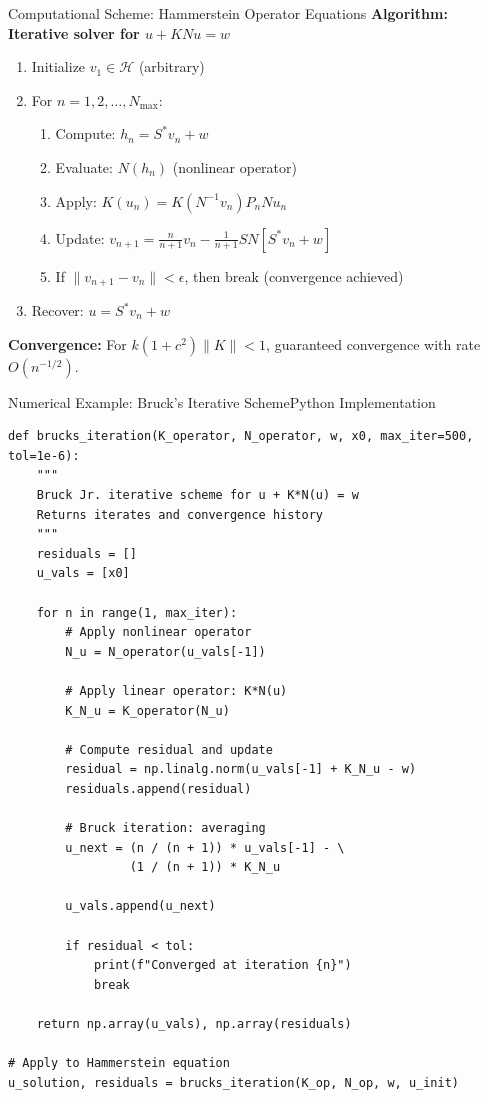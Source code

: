 \documentclass[aspectratio=169,10pt]{beamer}
\newcommand{\HH}{\mathcal{H}}
\begin{document}
\begin{frame}{Computational Scheme: Hammerstein Operator Equations}
    \textbf{Algorithm: Iterative solver for $u + KNu = w$}

    \begin{enumerate}
        \item Initialize $v_1 \in \HH$ (arbitrary)
        \item For $n = 1, 2, \ldots, N_{\max}$:
        \begin{enumerate}
            \item Compute: $h_n = S^*v_n + w$
            \item Evaluate: $N(h_n)$ (nonlinear operator)
            \item Apply: $K(u_n) = K(N^{-1}v_n)P_n Nu_n$
            \item Update: $v_{n+1} = \frac{n}{n+1}v_n - \frac{1}{n+1}SN[S^*v_n + w]$
            \item If $\|v_{n+1} - v_n\| < \epsilon$, then break (convergence achieved)
        \end{enumerate}
        \item Recover: $u = S^*v_n + w$
    \end{enumerate}

    \vspace{0.3cm}

    \textbf{Convergence:} For $k(1 + c^2)\|K\| < 1$, guaranteed convergence with rate $O(n^{-1/2})$.
\end{frame}

\begin{frame}[fragile]{Numerical Example: Bruck's Iterative Scheme}{Python Implementation}
    \begin{lstlisting}
def brucks_iteration(K_operator, N_operator, w, x0, max_iter=500, tol=1e-6):
    """
    Bruck Jr. iterative scheme for u + K*N(u) = w
    Returns iterates and convergence history
    """
    residuals = []
    u_vals = [x0]

    for n in range(1, max_iter):
        # Apply nonlinear operator
        N_u = N_operator(u_vals[-1])

        # Apply linear operator: K*N(u)
        K_N_u = K_operator(N_u)

        # Compute residual and update
        residual = np.linalg.norm(u_vals[-1] + K_N_u - w)
        residuals.append(residual)

        # Bruck iteration: averaging
        u_next = (n / (n + 1)) * u_vals[-1] - \
                 (1 / (n + 1)) * K_N_u

        u_vals.append(u_next)

        if residual < tol:
            print(f"Converged at iteration {n}")
            break

    return np.array(u_vals), np.array(residuals)

# Apply to Hammerstein equation
u_solution, residuals = brucks_iteration(K_op, N_op, w, u_init)
    \end{lstlisting}
\end{frame}
\end{document}
